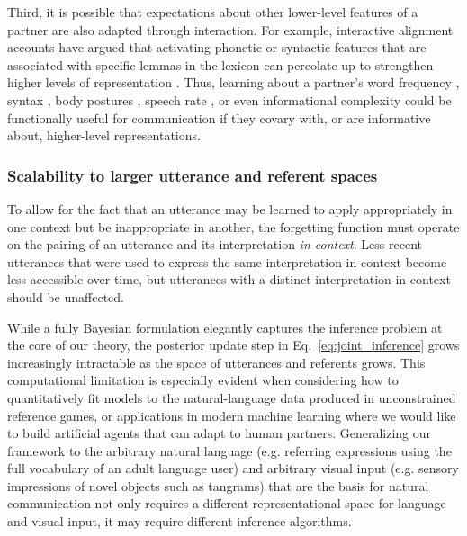 Third, it is possible that expectations about other lower-level features of a partner are also adapted through interaction.
For example, interactive alignment accounts \cite{pickering2004toward} have argued that activating phonetic or syntactic features that are associated with specific lemmas in the lexicon can percolate up to strengthen higher levels of representation \cite{roelofs1992spreading,pickering1998representation}.
Thus, learning about a partner's word frequency \cite{louwerse2012behavior}, syntax \cite{gruberg2019syntactic,levelt1982surface}, body postures \cite{lakin2003using}, speech rate \cite{giles1991contexts}, or even informational complexity \cite{abney2014complexity} could be functionally useful for communication if they covary with, or are informative about, higher-level representations. 

\subsubsection{Scalability to larger utterance and referent spaces}
To allow for the fact that an utterance may be learned to apply appropriately in one context but be inappropriate in another, the forgetting function must operate on the pairing of an utterance and its interpretation \textit{in context}.
Less recent utterances that were used to express the same interpretation-in-context  become less accessible over time, but utterances with a distinct interpretation-in-context should be unaffected. 

While a fully Bayesian formulation elegantly captures the inference problem at the core of our theory, the posterior update step in Eq.~\ref{eq:joint_inference} grows increasingly intractable as the space of utterances and referents grows. 
This computational limitation is especially evident when considering how to quantitatively fit models to the natural-language data produced in unconstrained reference games, or applications in modern machine learning where we would like to build artificial agents that can adapt to human partners.
Generalizing our framework to the arbitrary natural language (e.g. referring expressions using the full vocabulary of an adult language user) and arbitrary visual input (e.g. sensory impressions of novel objects such as tangrams) that are the basis for natural communication not only requires a different representational space for language and visual input, it may require different inference algorithms. 

